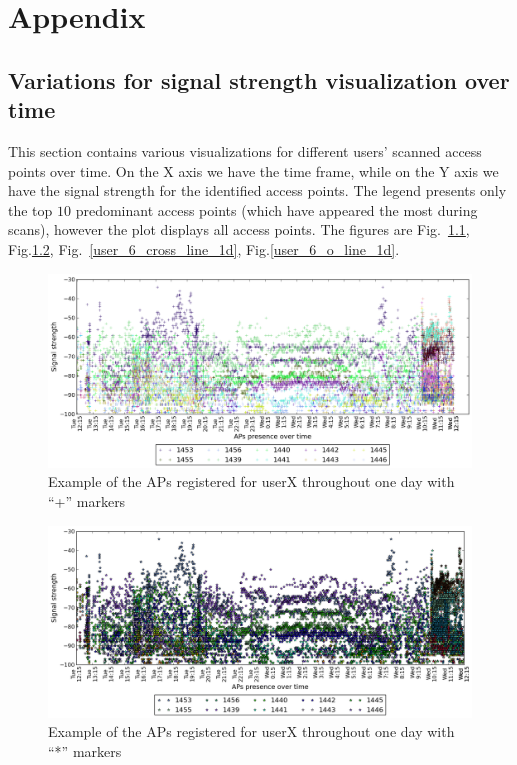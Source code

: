 \chapter{Appendix}

\section{Variations for signal strength visualization over time}
\label{appendix_signal_strength}

This section contains various visualizations for different users' scanned access
points over time. On the X axis we have the time frame, while on the Y axis we
have the signal strength for the identified access points. The legend presents
only the top $10$ predominant access points (which have appeared the most
during scans), however the plot displays all access points. The figures are
Fig.~\ref{user_6_cross_1d}, Fig.\ref{user_6_star_1d},
Fig.~\ref{user_6_cross_line_1d}, Fig.\ref{user_6_o_line_1d}.

\begin{figure}[!h]
\centering
\includegraphics[height =
0.45\textwidth]{figures/cros_user_6_sorted_1days_plot.png}
\caption{Example of the APs registered for userX throughout one day with
``+'' markers}
\label{user_6_cross_1d}
\end{figure}

\begin{figure}[!h]
\centering
\includegraphics[height =
0.45\textwidth]{figures/star_user_6_sorted_1days_plot.png}
\caption{Example of the APs registered for userX throughout one day with
``*'' markers}
\label{user_6_star_1d}
\end{figure}

